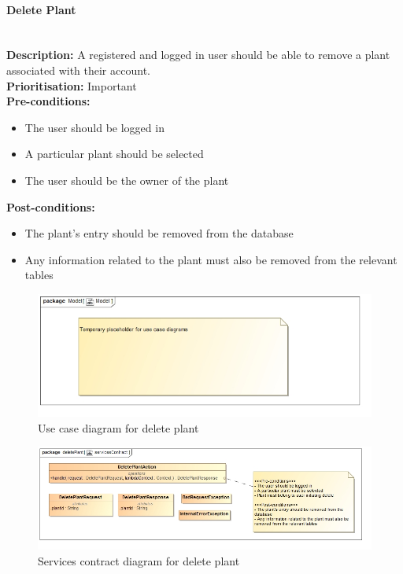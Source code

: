 \documentclass{article}
\begin{document}
	\paragraph{Delete Plant}\mbox{}\\
		\textbf{Description:} A registered and logged in user should be able to remove a plant associated with their account.\\
		\textbf{Prioritisation:} Important\\		
		\textbf{Pre-conditions:}
			\begin{itemize}
				\item The user should be logged in
				\item A particular plant should be selected
				\item The user should be the owner of the plant
			\end{itemize}
		\textbf{Post-conditions:}
			\begin{itemize}
				\item The plant's entry should be removed from the database
				\item Any information related to the plant must also be removed from the relevant tables
			\end{itemize}

		\begin{figure}[H]
			\includegraphics[width=\linewidth]{images/tempUseCase.jpg}
			\caption{Use case diagram for delete plant}
		\end{figure}
		
		\begin{figure}[H]
			\includegraphics[width=\linewidth]{images/ServicesContracts/deletePlant.jpg}
			\caption{Services contract diagram for delete plant}
		\end{figure}
	
\end{document}
